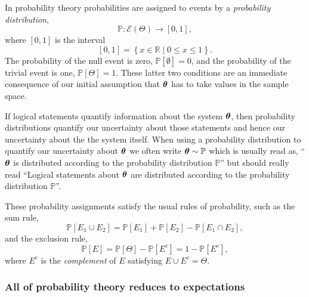 \documentclass[11pt, oneside]{article}
\newcommand{\PP}{ \mathbb{P} }
\newcommand{\RR}{ \mathbb{R} }
\newcommand{\bt}{ \mbox{\boldmath{$\theta$}} }
\begin{document}
In probability theory probabilities are assigned to events by a \emph{probability 
distribution},
%
\begin{equation*}
\PP : \mathcal{E} \! \left( \Theta \right) \rightarrow \left[0, 1 \right],
\end{equation*}
%
where $\left[0, 1\right]$ is the interval
%
\begin{equation*}
\left[ 0, 1 \right] = \left\{ x \in \RR \mid 0 \le x \le 1 \right\}.
\end{equation*}
%
The probability of the null event is zero, 
$\PP \! \left[ \emptyset \right] = 0$, and the probability of the trivial
event is one, $\PP \! \left[ \Theta \right] = 1$.  These latter
two conditions are an immediate consequence of our initial
assumption that $\bt$ has to take values in the sample space.

If logical statements quantify information about the system $\bt$, 
then probability distributions quantify our uncertainty about those 
statements and hence our uncertainty about the the system itself.  
When using a probability distribution to 
quantify our uncertainty about $\bt$ we often write $\bt \sim \PP$ which 
is usually read as, ``$\bt$ is distributed according to the probability 
distribution $\PP$'' but should really read ``Logical statements about 
$\bt$ are distributed according to the probability distribution $\PP$''.

These probability assignments satisfy the usual rules of probability, 
such as the sum rule,
%
\begin{equation*}
\PP \! \left[ E_{1} \cup E_{2} \right]
= 
\PP \! \left[ E_{1} \right] + \PP \! \left[ E_{2} \right] 
- \PP \! \left[ E_{1} \cap E_{2} \right],
\end{equation*}
%
and the exclusion rule,
%
\begin{equation*}
\PP \! \left[ E \right] 
= 
\PP \! \left[ \Theta \right] - \PP \! \left[ E^{c} \right]
=
1 - \PP \! \left[ E^{c} \right],
\end{equation*}
%
where $E^{c}$ is the \emph{complement} of $E$ satisfying
$E \cup E^{c} = \Theta$.
\subsubsection*{All of probability theory reduces to expectations}
\end{document}

